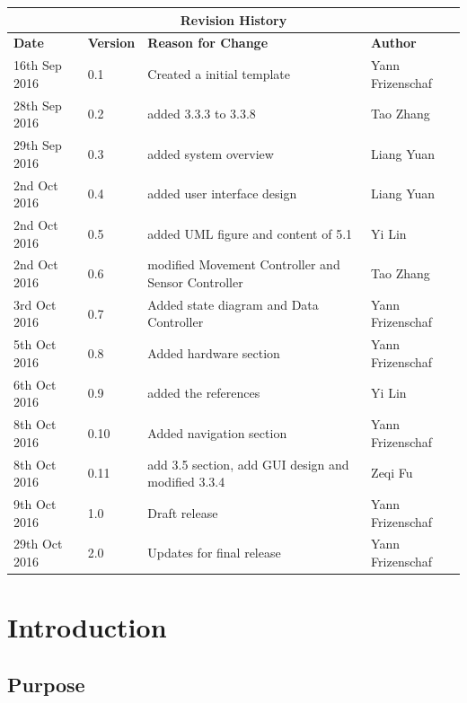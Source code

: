\documentclass[12pt]{article}
\begin{document}
\begin{table}
\begin{tabular}{ | p{}| p{}| p{}|p{}| }
\hline
\multicolumn{4}{|c|}{\textbf{Revision History}}\\
\hline
\textbf \textbf{Date} &  \textbf\textbf{Version} &  \textbf\textbf{Reason for Change} &  \textbf\textbf{Author}  \\
\hline
16th Sep 2016 & 0.1 & Created a initial template & Yann Frizenschaf\\
\hline
28th Sep 2016 & 0.2 & added 3.3.3 to 3.3.8 & Tao Zhang\\
\hline
29th Sep 2016 & 0.3 & added system overview & Liang Yuan\\
\hline
2nd Oct 2016 & 0.4 & added user interface design & Liang Yuan\\
\hline
2nd Oct 2016 & 0.5 & added UML figure and content of 5.1 & Yi Lin\\
\hline
2nd Oct 2016 & 0.6 & modified Movement Controller and Sensor Controller & Tao Zhang\\
\hline
3rd Oct 2016 & 0.7 & Added state diagram and Data Controller & Yann Frizenschaf\\
\hline
5th Oct 2016 & 0.8 & Added hardware section & Yann Frizenschaf\\
\hline
6th Oct 2016 & 0.9 & added the references & Yi Lin\\
\hline
8th Oct 2016 & 0.10 & Added navigation section & Yann Frizenschaf\\
\hline
8th Oct 2016 &0.11& add 3.5 section, add GUI design and modified 3.3.4 & Zeqi Fu\\
\hline
9th Oct 2016 & 1.0 & Draft release & Yann Frizenschaf \\
\hline
29th Oct 2016 & 2.0 & Updates for final release & Yann Frizenschaf \\
\hline
\end{tabular}
\end{table} 

\clearpage 

\pagebreak
\tableofcontents
\pagebreak


\section{Introduction}

\subsection{Purpose}
\end{document}
